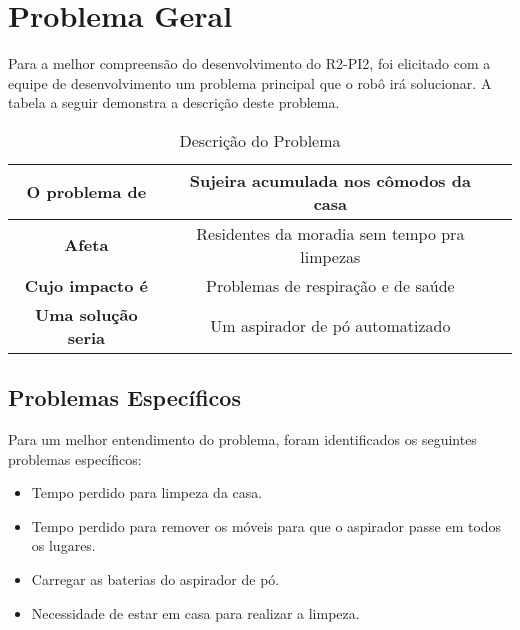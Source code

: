 \section{Problema Geral} %
\label{sub:problemaGeral}

Para a melhor compreensão do desenvolvimento do R2-PI2, foi elicitado com a equipe de desenvolvimento um problema principal que o robô irá solucionar. A tabela a seguir demonstra a descrição deste problema.

\begin{table}[H]
	\centering
	\caption{Descrição do Problema}
	\label{tab:equipe}
	\begin{tabular}{|c|c|c|}
	\hline
	\textbf{O problema de}      &  Sujeira acumulada nos cômodos da casa \\ \hline
	\textbf{Afeta}              &  Residentes da moradia sem tempo pra limpezas\\ \hline
	\textbf{Cujo impacto é}     &  Problemas de respiração e de saúde \\ \hline
	\textbf{Uma solução seria} 	&  Um aspirador de pó automatizado \\ \hline
	\end{tabular}
	\end{table}


\subsection{Problemas Específicos} %
\label{sub:problemas_específicos}

Para um melhor entendimento do problema, foram identificados os seguintes problemas específicos:

\begin{itemize}
	\item Tempo perdido para limpeza da casa.
	\item Tempo perdido para remover os móveis para que o aspirador passe em todos os lugares.
	\item Carregar as baterias do aspirador de pó.
	\item Necessidade de estar em casa para realizar a limpeza.
\end{itemize}

